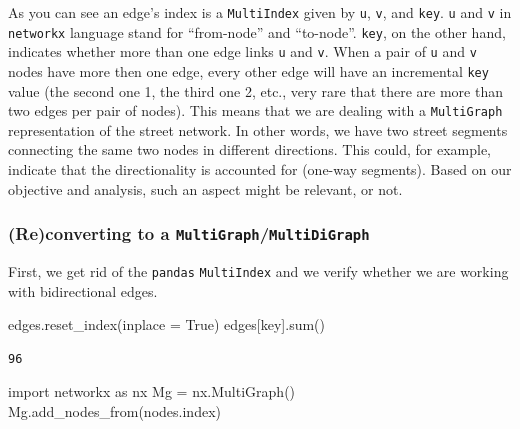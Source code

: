 \documentclass[
  letterpaper,
  DIV=11,
  numbers=noendperiod]{scrreprt}
\newenvironment{Shaded}{\begin{snugshade}}{\end{snugshade}}
\newcommand{\BuiltInTok}[1]{\textcolor[rgb]{0.00,0.23,0.31}{#1}}
\newcommand{\ImportTok}[1]{\textcolor[rgb]{0.00,0.46,0.62}{#1}}
\newcommand{\NormalTok}[1]{\textcolor[rgb]{0.00,0.23,0.31}{#1}}
\newcommand{\OperatorTok}[1]{\textcolor[rgb]{0.37,0.37,0.37}{#1}}
\newcommand{\StringTok}[1]{\textcolor[rgb]{0.13,0.47,0.30}{#1}}
\newcommand{\VariableTok}[1]{\textcolor[rgb]{0.07,0.07,0.07}{#1}}
\begin{document}
As you can see an edge's index is a \texttt{MultiIndex} given by
\texttt{u}, \texttt{v}, and \texttt{key}. \texttt{u} and \texttt{v} in
\texttt{networkx} language stand for ``from-node'' and ``to-node''.
\texttt{key}, on the other hand, indicates whether more than one edge
links \texttt{u} and \texttt{v}. When a pair of \texttt{u} and
\texttt{v} nodes have more then one edge, every other edge will have an
incremental \texttt{key} value (the second one 1, the third one 2, etc.,
very rare that there are more than two edges per pair of nodes). This
means that we are dealing with a \texttt{MultiGraph} representation of
the street network. In other words, we have two street segments
connecting the same two nodes in different directions. This could, for
example, indicate that the directionality is accounted for (one-way
segments). Based on our objective and analysis, such an aspect might be
relevant, or not.

\hypertarget{reconverting-to-a-multigraphmultidigraph}{%
\subsubsection{\texorpdfstring{(Re)converting to a
\texttt{MultiGraph}/\texttt{MultiDiGraph}}{(Re)converting to a MultiGraph/MultiDiGraph}}\label{reconverting-to-a-multigraphmultidigraph}}

First, we get rid of the \texttt{pandas} \texttt{MultiIndex} and we
verify whether we are working with bidirectional edges.

\begin{Shaded}
\begin{Highlighting}[]
\NormalTok{edges.reset\_index(inplace }\OperatorTok{=} \VariableTok{True}\NormalTok{)}
\NormalTok{edges[}\StringTok{\textquotesingle{}key\textquotesingle{}}\NormalTok{].}\BuiltInTok{sum}\NormalTok{()}
\end{Highlighting}
\end{Shaded}

\begin{verbatim}
96
\end{verbatim}

\begin{Shaded}
\begin{Highlighting}[]
\ImportTok{import}\NormalTok{ networkx }\ImportTok{as}\NormalTok{ nx}
\NormalTok{Mg }\OperatorTok{=}\NormalTok{ nx.MultiGraph()   }
\NormalTok{Mg.add\_nodes\_from(nodes.index)}
\end{Highlighting}
\end{Shaded}
\end{document}
